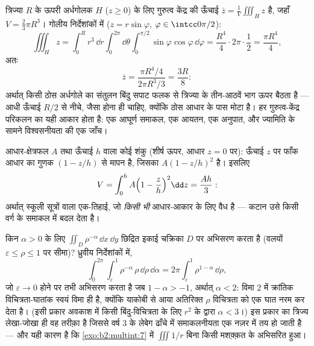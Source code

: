 \begin{example}[अर्धगोलक का गुरुत्व केंद्र]\label{ex:b2:multint:centroid}
त्रिज्या $R$ के ऊपरी अर्धगोलक $H$ ($z \geq 0$) के लिए गुरुत्व केंद्र की
ऊँचाई $\bar z = \frac1{V}\iiint_H z$ है, जहाँ $V =
\frac23\pi R^3$। गोलीय निर्देशांकों में ($z =
r\sin\varphi$, $\varphi \in \intcc0{\pi/2}$):
\[
\iiint_H z
= \int_0^R r^3\,\dd r\int_0^{2\pi}\dd\theta
\int_0^{\pi/2}\sin\varphi\cos\varphi\,\dd\varphi
= \frac{R^4}4\cdot2\pi\cdot\frac12 = \frac{\pi R^4}4 ,
\]
अतः
\[
\bar z = \frac{\pi R^4/4}{2\pi R^3/3} = \frac{3R}8 :
\]
अर्थात् किसी ठोस अर्धगोले का संतुलन बिंदु सपाट फलक से त्रिज्या के
तीन-आठवें भाग ऊपर बैठता है --- आधी ऊँचाई $R/2$ से नीचे, जैसा होना
ही चाहिए, क्योंकि ठोस आधार के पास मोटा है। हर गुरुत्व-केंद्र परिकलन
का यही आकार होता है: एक आघूर्ण समाकल, एक आयतन, एक अनुपात, और
ज्यामिति के सामने विश्वसनीयता की एक जाँच।
\end{example}

\begin{example}\label{ex:b2:multint:cone}
आधार-क्षेत्रफल $A$ तथा ऊँचाई $h$ वाला कोई शंकु (शीर्ष ऊपर, आधार
$z = 0$ पर): ऊँचाई $z$ पर फाँक आधार का गुणक $(1 -
z/h)$ से मापन है, जिसका
 $A(1 - z/h)^2$ है। इसलिए
\[
V = \int_0^h A\Bigl(1 - \frac zh\Bigr)^2\dd z = \frac{Ah}{3} :
\]
अर्थात् स्कूली सूत्रों वाला एक-तिहाई, जो \emph{किसी भी} आधार-आकार
के लिए वैध है --- कटान उसे किसी वर्ग के समाकल में बदल देता है।
\end{example}

\begin{example}\label{ex:b2:multint:threshold}
किन $\alpha > 0$ के लिए $\iint_{D}\rho^{-\alpha}\,\dd
x\,\dd y$ छिद्रित इकाई चक्रिका $D$ पर अभिसरण करता है
(वलयों $\varepsilon \leq \rho \leq 1$ पर सीमा)? ध्रुवीय निर्देशांकों में,
\[
\int_0^{2\pi}\!\!\int_\varepsilon^1\rho^{-\alpha}\,
\rho\,\dd\rho\,\dd\alpha
= 2\pi\int_\varepsilon^1\rho^{1-\alpha}\,\dd\rho ,
\]
जो $\varepsilon \to 0$ होने पर तभी अभिसरण करता है जब $1 - \alpha > -1$, अर्थात् $\alpha < 2$: विमा $2$
में क्रांतिक विचित्रता-घातांक स्वयं विमा ही है, क्योंकि याकोबी से
आया अतिरिक्त $\rho$ विचित्रता को एक घात नरम कर देता है। (इसी प्रकार
अवकाश में किसी बिंदु-विचित्रता के लिए $r^2$ के द्वारा $\alpha < 3$।) इस
प्रकार का त्रिज्य लेखा-जोखा ही वह तरीक़ा है जिससे वर्ष 3 के लेबेग
ढाँचे में समाकलनीयता एक नज़र में तय हो जाती है --- और यही कारण है
कि \cref{exo:b2:multint:7} में $\iiint 1/r$ बिना किसी मशक़्क़त के अभिसरित हुआ।
\end{example}

